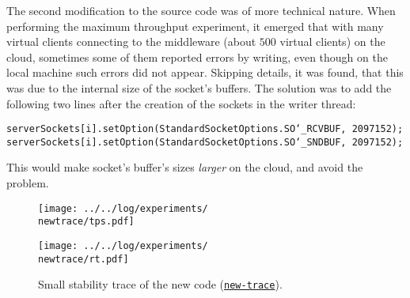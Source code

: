 \documentclass[11pt]{article}
\theoremstyle{definition}
\renewcommand\t\texttt
\newcommand\newtrace{02_stability_trace_16-11-15_14:14:51}
\begin{document}
\begin{appendices}
The second modification to the source code was of more technical nature.
When performing the maximum throughput experiment, it emerged that with many virtual clients connecting to the middleware (about $500$ virtual clients) on the cloud, sometimes some of them reported errors by writing, even though on the local machine such errors did not appear.
Skipping details, it was found, that this was due to the internal size of the socket's buffers.
The solution was to add the following two lines after the creation of the sockets in the writer thread:
\begin{center}
    \t{serverSockets[i].setOption(StandardSocketOptions.SO\char`_RCVBUF, 2097152);}\\
    \t{serverSockets[i].setOption(StandardSocketOptions.SO\char`_SNDBUF, 2097152);}
\end{center}
This would make socket's buffer's sizes \emph{larger} on the cloud, and avoid the problem.



\begin{figure}[!h]
    \centering
    \begin{minipage}[b]{0.45\linewidth}
        \texttt{[image: ../../log/experiments/\\newtrace/tps.pdf]}
    \end{minipage}
    \hspace{0.2cm}
    \begin{minipage}[b]{0.45\linewidth}
        \centering
        \texttt{[image: ../../log/experiments/\\newtrace/rt.pdf]}
    \end{minipage}
    \caption{Small stability trace of the new code (\hyperref[f:new-trace]{\t{new-trace}}).}
    \label{fig:newtrace}
\end{figure}


\end{appendices}
\end{document}
